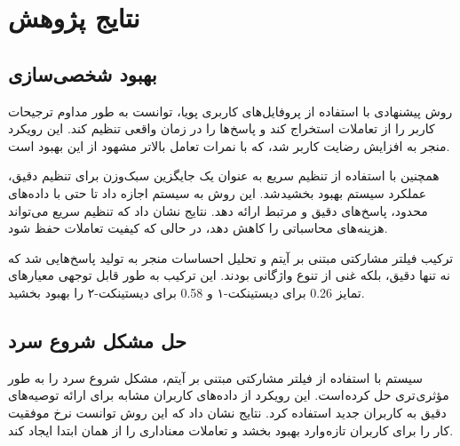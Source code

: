\section{نتایج پژوهش}

\subsection{بهبود شخصی‌سازی}

روش پیشنهادی با استفاده از پروفایل‌های کاربری پویا، توانست به طور مداوم ترجیحات کاربر را از تعاملات استخراج کند و پاسخ‌ها را در زمان واقعی تنظیم کند. این رویکرد منجر به افزایش رضایت کاربر شد، که با نمرات تعامل بالاتر مشهود از این بهبود است.

همچنین با استفاده از تنظیم سریع به عنوان یک جایگزین سبک‌وزن برای تنظیم دقیق، عملکرد سیستم بهبود بخشید شد. این روش به سیستم اجازه داد تا حتی با داده‌های محدود، پاسخ‌های دقیق و مرتبط ارائه دهد. نتایج نشان داد که تنظیم سریع می‌تواند هزینه‌های محاسباتی را کاهش دهد، در حالی که کیفیت تعاملات حفظ شود.


ترکیب فیلتر مشارکتی مبتنی بر آیتم و تحلیل احساسات منجر به تولید پاسخ‌هایی شد که نه تنها دقیق، بلکه غنی از تنوع واژگانی بودند. این ترکیب به طور قابل توجهی معیارهای تمایز
\num{0.26}
برای دیستینکت-۱ و 
\num{0.58}
 برای دیستینکت-۲ را بهبود بخشید.

\subsection{حل مشکل شروع سرد}

سیستم با استفاده از فیلتر مشارکتی مبتنی بر آیتم، مشکل شروع سرد را به طور مؤثری تری حل کرده است. این رویکرد از داده‌های کاربران مشابه برای ارائه توصیه‌های دقیق به کاربران جدید استفاده کرد. نتایج نشان داد که این روش توانست نرخ موفقیت کار را برای کاربران تازه وارد بهبود بخشد و تعاملات معناداری را از همان ابتدا ایجاد کند.

